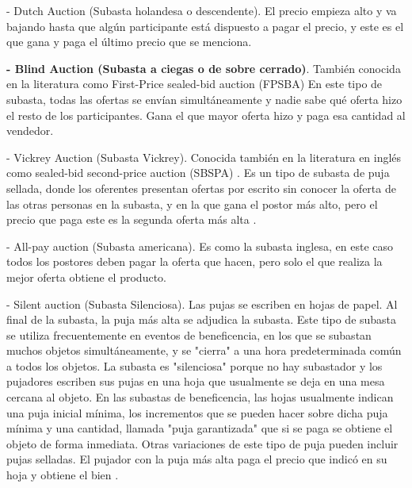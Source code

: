     - Dutch Auction (Subasta holandesa o descendente). El precio empieza alto y va bajando hasta que algún participante está 
    dispuesto a pagar el precio, y este es el que gana y paga el último precio que se menciona.

    \textbf{- Blind Auction (Subasta a ciegas o de sobre cerrado)}. También conocida en la literatura como First-Price sealed-bid 
    auction (FPSBA) En este tipo de subasta, todas las ofertas se envían simultáneamente y nadie sabe qué oferta hizo el resto
    de los participantes. Gana el que mayor oferta hizo y paga esa cantidad al vendedor.

    - Vickrey Auction (Subasta Vickrey). Conocida también en la literatura en inglés como sealed-bid second-price auction (SBSPA)
    . Es un tipo de subasta de puja sellada, donde los oferentes presentan ofertas por escrito sin conocer la oferta de las otras 
    personas en la subasta, y en la que gana el postor más alto, pero el precio que paga este es la segunda oferta más alta \parencite{economipediasubasta}.   

    - All-pay auction (Subasta americana). Es como la subasta inglesa, en este caso todos los postores deben pagar la oferta que hacen, 
    pero solo el que realiza la mejor oferta obtiene el producto.

    - Silent auction (Subasta Silenciosa).
    Las pujas se escriben en hojas de papel. Al final de la subasta, la puja más alta se adjudica la subasta. Este tipo de subasta se 
    utiliza frecuentemente en eventos de beneficencia, en los que se subastan muchos objetos simultáneamente, y se "cierra" a una hora 
    predeterminada común a todos los objetos. La subasta es "silenciosa" porque no hay subastador y los pujadores escriben sus pujas en 
    una hoja que usualmente se deja en una mesa cercana al objeto. En las subastas de beneficencia, las hojas usualmente indican una 
    puja inicial mínima, los incrementos que se pueden hacer sobre dicha puja mínima y una cantidad, llamada "puja garantizada" que si 
    se paga se obtiene el objeto de forma inmediata. Otras variaciones de este tipo de puja pueden incluir pujas selladas. El pujador 
    con la puja más alta paga el precio que indicó en su hoja y obtiene el bien \parencite{investopedia}.

